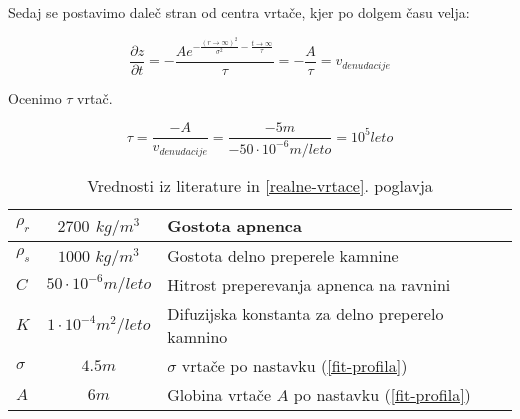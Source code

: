 \documentclass[a4paper, oneside, 12pt]{book}
\begin{document}
  Sedaj se postavimo daleč stran od centra vrtače, kjer po dolgem času velja:

  \begin{equation}
    \frac{\partial z}{\partial t} = -\frac{A e^{-\frac{(r \rightarrow \infty)^2}{\sigma ^2}-\frac{t \rightarrow \infty}{\tau }}}{\tau } = -\frac{A}{\tau} = v_{denudacije}
    \label{hitrost-denudacije}
  \end{equation}

  Ocenimo $\tau$ vrtač.

  \begin{equation}
    \tau = \frac{-A}{v_{denudacije}}=\frac{-5m}{-50\cdot 10^{-6} m/leto} = 10^5 leto
    \label{tau-vrtace}
  \end{equation}

  \begin{table}[H]
    \centering
    \begin{tabular}{| l | c | l | l |} \hline
      $\rho_r$ & $2700$ $kg/m^3$ & Gostota apnenca                                            \\ \hline
      $\rho_s$ & $1000$ $kg/m^3$ & Gostota delno preperele kamnine                            \\ \hline
      $C$      & $50 \cdot 10^{-6} m/leto$  & Hitrost preperevanja apnenca na ravnini         \\ \hline
      $K$      & $1 \cdot 10^{-4} m^2/leto$ & Difuzijska konstanta za delno preperelo kamnino \\ \hline
      $\sigma$ & $4.5m$ & $\sigma$ vrtače po nastavku (\ref{fit-profila})                     \\ \hline
      $A$      & $6m$ & Globina vrtače $A$ po nastavku (\ref{fit-profila})                    \\ \hline
    \end{tabular}
    \caption{Vrednosti iz literature \cite{Gams1967} \cite{ford2007karst} \cite{fleurant2008modelling} in \ref{realne-vrtace}. poglavja}
    \label{tab:tabela-konstant}
  \end{table}
\end{document}
